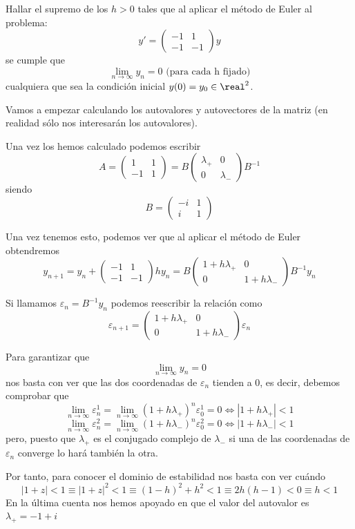 \begin{problem}[3]
Hallar el supremo de los $h>0$ tales que al aplicar el método de Euler al problema:
\[y'=\left(\begin{array}{cc}-1 & 1 \\ -1 & -1 \end{array} \right)y\]
se cumple que
\[\lim_{n \to \infty}y_n=0 \text{ (para cada h fijado)}\]
cualquiera que sea la condición inicial $y(0)=y_0 \in \real^2$.
\solution

Vamos a empezar calculando los autovalores y autovectores de la matriz (en realidad sólo nos interesarán los autovalores).

Una vez los hemos calculado podemos escribir
\[A = \left(\begin{array}{cc}1 & 1 \\ -1 & 1 \end{array} \right) = B\left(\begin{array}{cc}λ_+ & 0 \\ 0 & λ_- \end{array} \right)B^{-1}\]
siendo
\[B= \left(\begin{array}{cc}-i & 1 \\ i & 1 \end{array} \right)\]

Una vez tenemos esto, podemos ver que al aplicar el método de Euler obtendremos
\[y_{n+1} =y_n+\left(\begin{array}{cc}-1 & 1 \\ -1 & -1\end{array} \right)hy_n =  B \left(\begin{array}{cc}1+hλ_+ & 0 \\ 0 & 1+hλ_- \end{array} \right)B^{-1}y_n\]

Si llamamos $ε_n=B^{-1}y_n$ podemos reescribir la relación como
\[ε_{n+1} = \left(\begin{array}{cc}1+hλ_+ & 0 \\ 0 & 1+hλ_- \end{array} \right)ε_n\]

Para garantizar que
\[\lim_{n \to \infty}y_n=0\]
nos basta con ver que las dos coordenadas de $ε_n$ tienden a 0, es decir, debemos comprobar que
\[\lim_{n\to \infty}ε_n^1=\lim_{n \to \infty} (1+hλ_+)^nε_0^1 = 0 \iff |1+hλ_+|<1\]
\[\lim_{n\to \infty}ε_n^2=\lim_{n \to \infty} (1+hλ_-)^nε_0^2 = 0 \iff |1+hλ_-|<1\]
pero, puesto que $λ_+$ es el conjugado complejo de $λ_-$ si una de las coordenadas de $ε_n$ converge lo hará también la otra.

Por tanto, para conocer el dominio de estabilidad nos basta con ver cuándo
\[|1+z|<1 \equiv |1+z|^2 < 1 \equiv (1-h)^2+h^2 < 1 \equiv 2h(h-1)<0 \equiv h<1\]
\obs En la última cuenta nos hemos apoyado en que el valor del autovalor es $λ_+=-1+i$
\end{problem}



